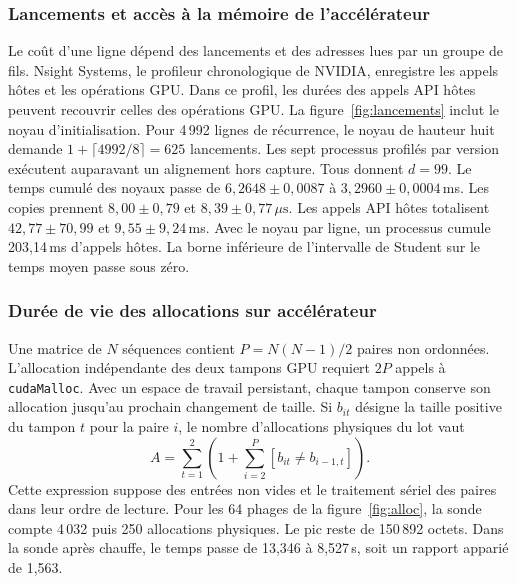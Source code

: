 
\subsubsection{Lancements et accès à la mémoire de l’accélérateur}
Le coût d'une ligne dépend des lancements et des adresses lues par un groupe de fils. Nsight Systems, le profileur chronologique de NVIDIA, enregistre les appels hôtes et les opérations GPU. Dans ce profil, les durées des appels API hôtes peuvent recouvrir celles des opérations GPU.
La figure~\ref{fig:lancements} inclut le noyau d'initialisation. Pour 4\,992 lignes de récurrence, le noyau de hauteur huit demande \(1+\lceil4992/8\rceil=625\) lancements. Les sept processus profilés par version exécutent auparavant un alignement hors capture. Tous donnent \(d=99\). Le temps cumulé des noyaux passe de \(6{,}2648\pm0{,}0087\) à \(3{,}2960\pm0{,}0004\)\,ms. Les copies prennent \(8{,}00\pm0{,}79\) et \(8{,}39\pm0{,}77\)\,\(\mu\mathrm{s}\). Les appels API hôtes totalisent \(42{,}77\pm70{,}99\) et \(9{,}55\pm9{,}24\)\,ms. Avec le noyau par ligne, un processus cumule 203,14\,ms d’appels hôtes. La borne inférieure de l’intervalle de Student sur le temps moyen passe sous zéro.

\subsubsection{Durée de vie des allocations sur accélérateur}
Une matrice de \(N\) séquences contient \(P=N(N-1)/2\) paires non ordonnées. L'allocation indépendante des deux tampons GPU requiert \(2P\) appels à \texttt{cudaMalloc}. Avec un espace de travail persistant, chaque tampon conserve son allocation jusqu'au prochain changement de taille. Si \(b_{it}\) désigne la taille positive du tampon \(t\) pour la paire \(i\), le nombre d'allocations physiques du lot vaut
\[
 A=\sum_{t=1}^2\left(1+\sum_{i=2}^{P}[b_{it}\ne b_{i-1,t}]\right).
\]
Cette expression suppose des entrées non vides et le traitement sériel des paires dans leur ordre de lecture.
Pour les 64 phages de la figure~\ref{fig:alloc}, la sonde compte 4\,032 puis 250 allocations physiques. Le pic reste de 150\,892 octets. Dans la sonde après chauffe, le temps passe de 13,346 à 8,527\,s, soit un rapport apparié de 1,563.

